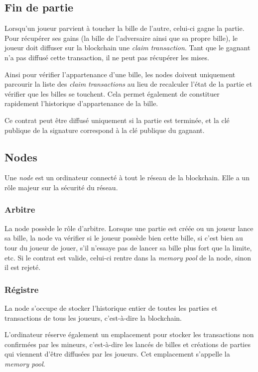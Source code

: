 \documentclass{article}
\begin{document}
\subsection{Fin de partie}
Lorsqu'un joueur parvient à toucher la bille de l'autre, celui-ci gagne la partie. Pour récupérer ses gains (la bille de l'adversaire ainsi que sa propre bille), le joueur doit diffuser sur la blockchain une \textit{claim transaction}. Tant que le gagnant n'a pas diffusé cette transaction, il ne peut pas récupérer les mises.

Ainsi pour vérifier l'appartenance d'une bille, les nodes doivent uniquement parcourir la liste des \textit{claim transactions} au lieu de recalculer l'état de la partie et vérifier que les billes se touchent. 
Cela permet également de constituer rapidement l'historique d'appartenance de la bille. 

Ce contrat peut être diffusé uniquement si la partie est terminée, et la clé publique de la signature correspond à la clé publique du gagnant.

\subsection{Nodes}
Une \textit{node} est un ordinateur connecté à tout le réseau de la blockchain. Elle a un rôle majeur sur la sécurité du réseau.

\subsubsection{Arbitre}
La node possède le rôle d'arbitre.
Lorsque une partie est créée ou un joueur lance sa bille, la node va vérifier si le joueur possède bien cette bille, si c'est bien au tour du joueur de jouer, s'il n'essaye pas de lancer sa bille plus fort que la limite, etc.
Si le contrat est valide, celui-ci rentre dans la \textit{memory pool} de la node, sinon il est rejeté.

\subsubsection{Régistre}
La node s'occupe de stocker l'historique entier de toutes les parties et transactions de tous les joueurs, c'est-à-dire la blockchain.

L'ordinateur réserve également un emplacement pour stocker les transactions non confirmées par les mineurs, c'est-à-dire les lancés de billes et créations de parties qui viennent d'être diffusées par les joueurs. Cet emplacement s'appelle la \textit{memory pool}.
\end{document}
